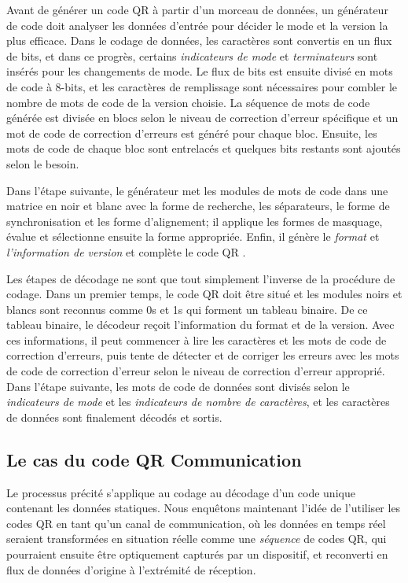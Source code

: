 Avant de générer un code QR à partir d'un morceau de données, un générateur de code doit analyser les données d'entrée pour décider le mode et la version la plus efficace. Dans le codage de données, les caractères sont convertis en un flux de bits, et dans ce progrès, certains \emph{indicateurs de mode} et \emph{terminateurs} sont insérés pour les changements de mode. Le flux de bits est ensuite divisé en mots de code à 8-bits, et les caractères de remplissage sont nécessaires pour combler le nombre de mots de code de la version choisie. La séquence de mots de code générée est divisée en blocs selon le niveau de correction d'erreur spécifique et un mot de code de correction d'erreurs est généré pour chaque bloc. Ensuite, les mots de code de chaque bloc sont entrelacés et quelques bits restants sont ajoutés selon le besoin.

Dans l'étape suivante, le générateur met les modules de mots de code dans une matrice en noir et blanc avec la forme de recherche, les séparateurs, le forme de synchronisation et les forme d'alignement; il applique les formes de masquage, évalue et sélectionne ensuite la forme appropriée. Enfin, il génère le \emph{format} et \emph{l'information de version} et complète le code QR \citep{iso18004}.

Les étapes de décodage ne sont que tout simplement l'inverse de la procédure de codage. Dans un premier temps, le code QR doit être situé et les modules noirs et blancs sont reconnus comme 0s et 1s qui forment un tableau binaire. De ce tableau binaire, le décodeur reçoit l'information du format et de la version. Avec ces informations, il peut commencer à lire les caractères et les mots de code de correction d'erreurs, puis tente de détecter et de corriger les erreurs avec les mots de code de correction d'erreur selon le niveau de correction d'erreur approprié. Dans l'étape suivante, les mots de code de données sont divisés selon le \emph{indicateurs de mode} et les \emph{indicateurs de nombre de caractères}, et les caractères de données sont finalement décodés et sortis.

\subsection{Le cas du code QR Communication}

Le processus précité s'applique au codage au décodage d'un code unique contenant les données statiques. Nous enquêtons maintenant l'idée de l'utiliser les codes QR en tant qu'un canal de communication, où les données en temps réel seraient transformées en situation réelle comme une \emph{séquence} de codes QR, qui pourraient ensuite être optiquement capturés par un dispositif, et reconverti en flux de données d'origine à l'extrémité de réception.

